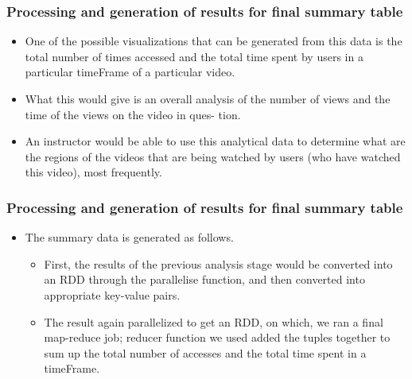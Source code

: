 \documentclass[12pt,xcolor=dvipsnames]{beamer}
\begin{document}

\begin{frame}[t]
\frametitle{Processing and generation of results for final summary table}
\vfill
\begin{itemize}

\item One of the possible visualizations that can be generated from this data is the total number of times
accessed and the total time spent by users in a particular timeFrame of a particular video.

\item What this would give is an overall analysis of the number of views and the time of the views on the video in ques-
tion. 

\item An instructor would be able to use this analytical data to determine what are the regions of the
videos that are being watched by users (who have watched this video), most frequently.


\end{itemize}
\end{frame}



\begin{frame}[t]
\frametitle{Processing and generation of results for final summary table}
\vfill
\begin{itemize}

\item The summary data is generated as follows. 

\begin{itemize}
\item First, the results of the previous analysis stage would be
converted into an RDD through the parallelise function, and then converted into appropriate key-value
pairs.
\item The result again parallelized to get an RDD, on which, we ran a final
map-reduce job; reducer function we used added the tuples
together to sum up the total number of accesses and the total time spent in a timeFrame.

\end{itemize} 

\end{itemize}
\end{frame}
\end{document}
